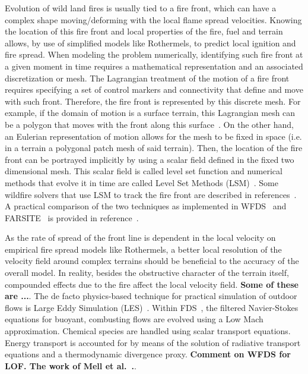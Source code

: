 \documentclass[journal,article,atmosphere,submit,moreauthors,pdftex]{Definitions/mdpi}
\begin{document}
Evolution of wild land fires is usually tied to a fire front, which can have a complex shape moving/deforming with the local flame spread velocities. Knowing the location of this fire front and local properties of the fire, fuel and terrain allows, by use of simplified models like Rothermels, to predict local ignition and fire spread. When modeling the problem numerically, identifying such fire front at a given moment in time requires a mathematical representation and an associated discretization or mesh. The Lagrangian treatment of the motion of a fire front requires specifying a set of control markers and connectivity that define and move with such front. Therefore, the fire front is represented by this discrete mesh. For example, if the domain of motion is a surface terrain, this Lagrangian mesh can be a polygon that moves with the front along this surface~\cite{Finney:FARSITE,Bova:IJWF2015}.
On the other hand, an Eulerian representation of motion allows for the mesh to be fixed in space (i.e. in a terrain a polygonal patch mesh of said terrain). Then, the location of the fire front can be portrayed implicitly by using a scalar field defined in the fixed two dimensional mesh. This scalar field is called level set function and numerical methods that evolve it in time are called Level Set Methods (LSM)~\cite{Sethian:1999,Osher:2006}. Some wildfire solvers that use LSM to track the fire front are described in references~\cite{coen_2013,Bova:IJWF2015,mcgratta_2013,LAUTENBERGER_2013}. A practical comparison of the two techniques as implemented in WFDS~\cite{Mell:IJWF2007} and FARSITE~\cite{Finney:FARSITE} is provided in reference~\cite{Bova:IJWF2015}.

As the rate of spread of the front line is dependent in the local velocity on empirical fire spread models like Rothermels, a better local resolution of the velocity field around complex terrains should be beneficial to the accuracy of the overall model. In reality, besides the obstructive character of the terrain itself, compounded effects due to the fire affect the local velocity field. \textbf{Some of these are ...}.
The de facto physics-based technique for practical simulation of outdoor flows is Large Eddy Simulation (LES)~\cite{coen_2013,mcgratta_2013}. Within FDS~\cite{mcgratta_2013},  the filtered Navier-Stokes equations for buoyant, combusting flows are evolved using a Low Mach approximation. Chemical species are handled using scalar transport equations. Energy transport is accounted for by means of the solution of radiative transport equations and a thermodynamic divergence proxy. \textbf{Comment on WFDS for LOF. The work of Mell et al.~\cite{Mell:IJWF2007}.}.
\end{document}
